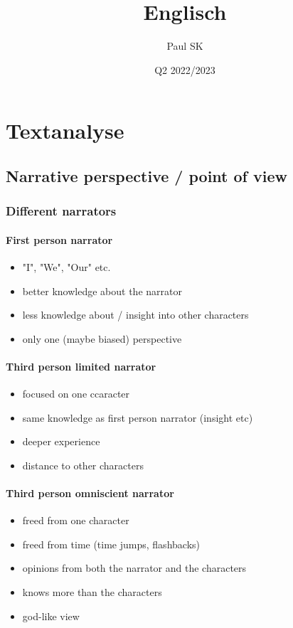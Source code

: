 \documentclass{article}
\title{Englisch}
\date{Q2 2022/2023}
\author{Paul SK}
\begin{document}
	\maketitle
	\newpage


	\section{Textanalyse}

	\subsection{Narrative perspective / point of view}

	\subsubsection{Different narrators}

	\paragraph{First person narrator}
	\begin{itemize}
		\item "I", "We", "Our" etc.
		\item better knowledge about the narrator
		\item less knowledge about / insight into other characters
		\item only one (maybe biased) perspective
	\end{itemize}

	\paragraph{Third person limited narrator}
	\begin{itemize}
		\item focused on one ccaracter
		\item same knowledge as first person narrator (insight etc)
		\item deeper experience
		\item distance to other characters
	\end{itemize}

	\paragraph{Third person omniscient narrator}
	\begin{itemize}
		\item freed from one character
		\item freed from time (time jumps, flashbacks)
		\item opinions from both the narrator and the characters
		\item knows more than the characters
		\item god-like view
	\end{itemize}
\end{document}
